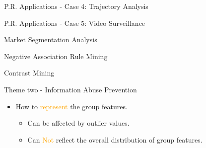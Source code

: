 \documentclass[
 size=14pt,
 paper=smartboard,  %
 mode=present, 		%
 display=slides, 	%
 style=tuliplab,  	%
 pauseslide,
 fleqn,leqno]{powerdot}
\begin{document}
\begin{slide}[toc=,bm=]{P.R. Applications - Case 4: Trajectory Analysis}


\end{slide}


\begin{slide}[toc=,bm=]{P.R. Applications - Case 5: Video Surveillance}


\end{slide}


\begin{slide}[toc=,bm=]{Market Segmentation Analysis}


\end{slide}


\begin{slide}[toc=,bm=]{Negative Association Rule Mining}


\end{slide}


\begin{slide}[toc=,bm=]{Contrast Mining}


\end{slide}


\begin{slide}{Theme two - Information Abuse Prevention}
\begin{itemize}
\item
How to \textcolor{orange}{represent} the group features.

\begin{itemize}
\item
Can be affected by outlier values.

\item
Can \textcolor{orange}{Not} reflect the overall distribution of group features.
\end{itemize}
\end{itemize}

\end{slide}
\end{document}
